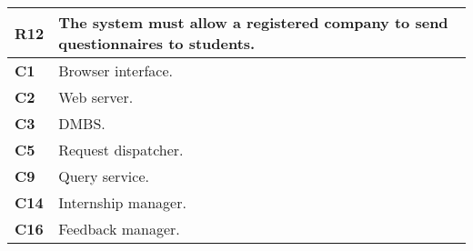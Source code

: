\begin{table}[H]
    \centering
    \begin{tabular}{|l|m{10cm}|}
        \hline \textbf{R12} & The system must allow a registered company to send questionnaires to students.\\
        \hline \textbf{C1} & Browser interface. \\
        \hline \textbf{C2} & Web server. \\
        \hline \textbf{C3} & DMBS. \\
        \hline \textbf{C5} & Request dispatcher. \\
        \hline \textbf{C9} & Query service. \\
        \hline \textbf{C14} & Internship manager. \\
        \hline \textbf{C16} & Feedback manager. \\
        \hline
    \end{tabular}
\end{table}


